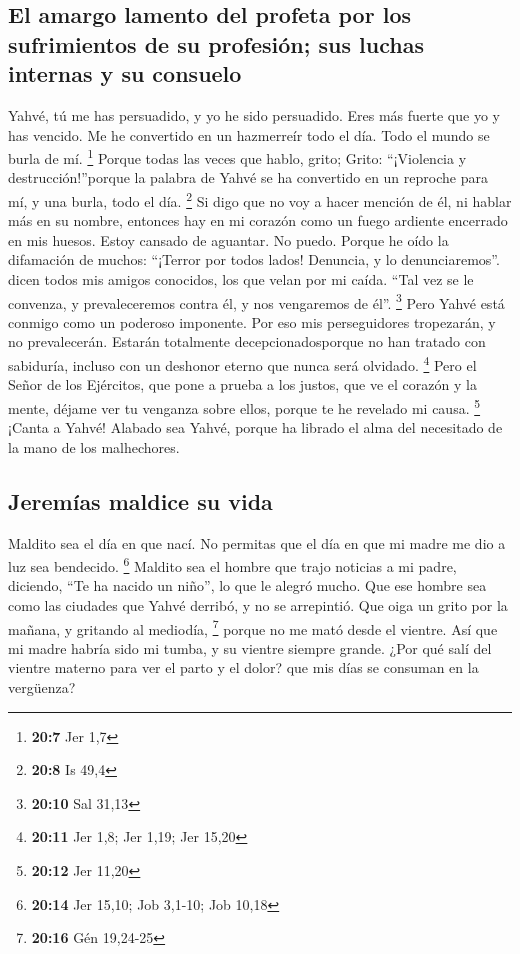 \hypertarget{el-amargo-lamento-del-profeta-por-los-sufrimientos-de-su-profesiuxf3n-sus-luchas-internas-y-su-consuelo}{%
\subsection{El amargo lamento del profeta por los sufrimientos de su
profesión; sus luchas internas y su
consuelo}\label{el-amargo-lamento-del-profeta-por-los-sufrimientos-de-su-profesiuxf3n-sus-luchas-internas-y-su-consuelo}}

 Yahvé, tú me has persuadido, y yo he sido persuadido.
Eres más fuerte que yo y has vencido. Me he convertido en un hazmerreír
todo el día. Todo el mundo se burla de mí. \footnote{\textbf{20:7} Jer
  1,7}  Porque todas las veces que hablo, grito; Grito:
``¡Violencia y destrucción!''porque la palabra de Yahvé se ha convertido
en un reproche para mí, y una burla, todo el día. \footnote{\textbf{20:8}
  Is 49,4}  Si digo que no voy a hacer mención de él, ni
hablar más en su nombre, entonces hay en mi corazón como un fuego
ardiente encerrado en mis huesos. Estoy cansado de aguantar. No puedo.
 Porque he oído la difamación de muchos: ``¡Terror por
todos lados! Denuncia, y lo denunciaremos''. dicen todos mis amigos
conocidos, los que velan por mi caída. ``Tal vez se le convenza, y
prevaleceremos contra él, y nos vengaremos de él''. \footnote{\textbf{20:10}
  Sal 31,13}  Pero Yahvé está conmigo como un poderoso
imponente. Por eso mis perseguidores tropezarán, y no prevalecerán.
Estarán totalmente decepcionadosporque no han tratado con sabiduría,
incluso con un deshonor eterno que nunca será olvidado. \footnote{\textbf{20:11}
  Jer 1,8; Jer 1,19; Jer 15,20}  Pero el Señor de los
Ejércitos, que pone a prueba a los justos, que ve el corazón y la mente,
déjame ver tu venganza sobre ellos, porque te he revelado mi causa.
\footnote{\textbf{20:12} Jer 11,20}  ¡Canta a Yahvé!
Alabado sea Yahvé, porque ha librado el alma del necesitado de la mano
de los malhechores.

\hypertarget{jeremuxedas-maldice-su-vida}{%
\subsection{Jeremías maldice su
vida}\label{jeremuxedas-maldice-su-vida}}

 Maldito sea el día en que nací. No permitas que el día
en que mi madre me dio a luz sea bendecido. \footnote{\textbf{20:14} Jer
  15,10; Job 3,1-10; Job 10,18}  Maldito sea el hombre
que trajo noticias a mi padre, diciendo, ``Te ha nacido un niño'', lo
que le alegró mucho.  Que ese hombre sea como las
ciudades que Yahvé derribó, y no se arrepintió. Que oiga un grito por la
mañana, y gritando al mediodía, \footnote{\textbf{20:16} Gén 19,24-25}
 porque no me mató desde el vientre. Así que mi madre
habría sido mi tumba, y su vientre siempre grande.  ¿Por
qué salí del vientre materno para ver el parto y el dolor? que mis días
se consuman en la vergüenza?

